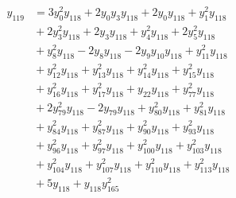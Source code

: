 \begin{align*}
y_{119} &={} 3y_{0}^{2}y_{118} +2y_{0}y_{3}y_{118} +2y_{0}y_{118} +y_{1}^{2}y_{118} \\
 &{} +2y_{3}^{2}y_{118} +2y_{3}y_{118} +y_{4}^{2}y_{118} +2y_{5}^{2}y_{118} \\
 &{} +y_{8}^{2}y_{118} -2y_{8}y_{118} -2y_{9}y_{10}y_{118} +y_{11}^{2}y_{118} \\
 &{} +y_{12}^{2}y_{118} +y_{13}^{2}y_{118} +y_{14}^{2}y_{118} +y_{15}^{2}y_{118} \\
 &{} +y_{16}^{2}y_{118} +y_{17}^{2}y_{118} +y_{22}y_{118} +y_{77}^{2}y_{118} \\
 &{} +2y_{79}^{2}y_{118} -2y_{79}y_{118} +y_{80}^{2}y_{118} +y_{81}^{2}y_{118} \\
 &{} +y_{84}^{2}y_{118} +y_{87}^{2}y_{118} +y_{90}^{2}y_{118} +y_{93}^{2}y_{118} \\
 &{} +y_{96}^{2}y_{118} +y_{97}^{2}y_{118} +y_{100}^{2}y_{118} +y_{103}^{2}y_{118} \\
 &{} +y_{104}^{2}y_{118} +y_{107}^{2}y_{118} +y_{110}^{2}y_{118} +y_{113}^{2}y_{118} \\
 &{} +5y_{118} +y_{118}y_{165}^{2}
\end{align*}
